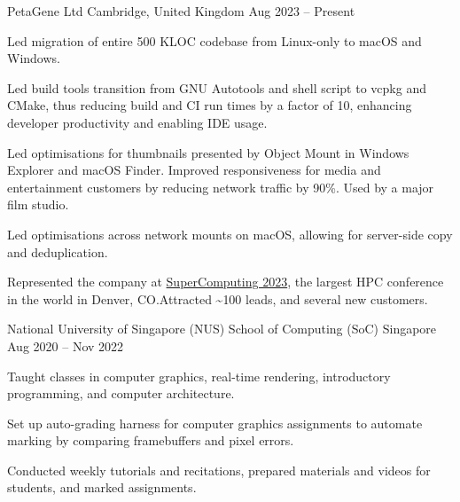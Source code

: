\begin{cventries}
	{PetaGene Ltd} %
	{Cambridge, United Kingdom} %
	{Aug 2023 -- Present} %
	{
		\vspace{4mm}
		\begin{cvitems} %
			\item Led migration of entire 500 KLOC codebase from Linux-only to macOS and Windows.
			\item Led build tools transition from GNU Autotools and shell script to vcpkg and CMake, thus reducing build and CI run times by a factor of 10, enhancing developer productivity and enabling IDE usage.
			\item Led optimisations for thumbnails presented by Object Mount in Windows Explorer and macOS Finder. Improved responsiveness for media and entertainment customers by reducing network traffic by 90\%. Used by a major film studio.
			\item Led optimisations across network mounts on macOS, allowing for server-side copy and deduplication.
			\item Represented the company at \href{https://hallerickson.ungerboeck.com/prod/app85.cshtml?aat=5663535078317a434974474478437845326c2b766b2b4c562b355033396d433556704e2b3065744c5161773d&ExhibitorID=7040}{SuperComputing 2023}, the largest HPC conference in the world in Denver, CO.\@ Attracted \textasciitilde100 leads, and several new customers.
		\end{cvitems}
	}


	{National University of Singapore (NUS) School of Computing (SoC)} %
	{Singapore} %
	{Aug 2020 -- Nov 2022} %
	{
		\begin{cvitems} %
			\item Taught classes in computer graphics, real-time rendering, introductory programming, and computer architecture.
			\item Set up auto-grading harness for computer graphics assignments to automate marking by comparing framebuffers and pixel errors.
			\item Conducted weekly tutorials and recitations, prepared materials and videos for students, and marked assignments.
		\end{cvitems}
	}


\end{cventries}
